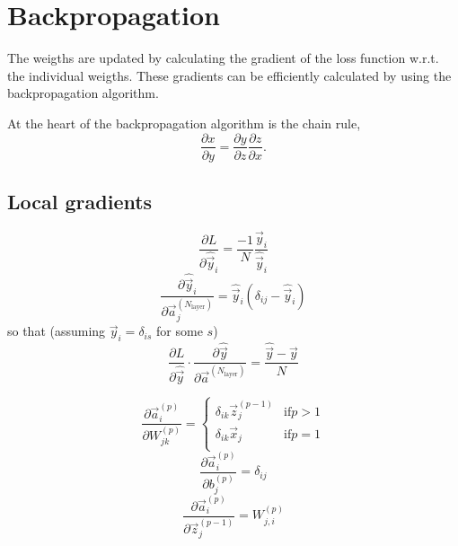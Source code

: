\documentclass[oneside]{memoir}
\newcommand{\yhat}{\ensuremath{\hat{\vec{y}}}}
\begin{document}
\section{Backpropagation} 
The weigths are updated by calculating the gradient of the loss function w.r.t. the individual weigths. These gradients can be efficiently calculated by using the backpropagation algorithm.

At the heart of the backpropagation algorithm is the chain rule,
\begin{equation}
  \label{chain rule}
  \frac{\partial x}{\partial y} = \frac{\partial y}{\partial z} \frac{\partial z}{\partial x}.
\end{equation}




\subsection{Local gradients}

\begin{equation}
  \label{dLdyhat}
  \frac{\partial L}{\partial \hat{\vec{y}}_i} = \frac{-1}{N} \frac{\vec{y}_i}{\hat{\vec{y}}_i}
\end{equation}
\begin{equation}
  \label{dyhatda}
  \frac{\partial \hat{\vec{y}}_i}{\partial \vec{a}_j^{(N_{\text{layer}})}} = \hat{\vec{y}}_i ( \delta_{ij} - \hat{\vec{y}}_i)
\end{equation}
so that (assuming $\vec{y}_i= \delta_{is}$ for some $s$) 
\begin{equation}
  \label{dLdyhat times dyhatda}
  \frac{\partial L}{\partial \hat{\vec{y}}} \cdot \frac{\partial \hat{\vec{y}}}{\partial \vec{a}^{(N_{\text{layer}})}}  = \frac{\yhat- \vec{y}}{N}
\end{equation}

\begin{equation}
  \label{dadW}
  \frac{\partial \vec{a}_i^{(p)}}{\partial W^{(p)}_{jk}} = 
  \begin{cases}
    \delta_{ik} \vec{z}_j^{(p-1)} & \text{if} p > 1 \\
    \delta_{ik} \vec{x}_j& \text{if} p = 1 \\
  \end{cases}
\end{equation}
\begin{equation}
  \label{dadb}
  \frac{\partial \vec{a}_i^{(p)}}{\partial b^{(p)}_{j}} = \delta_{ij}
\end{equation}
\begin{equation}
  \label{dadz}
  \frac{\partial \vec{a}_i^{(p)}}{\partial \vec{z}^{(p-1)}_{j}} = W_{j,i}^{(p)}
\end{equation}
\end{document}
